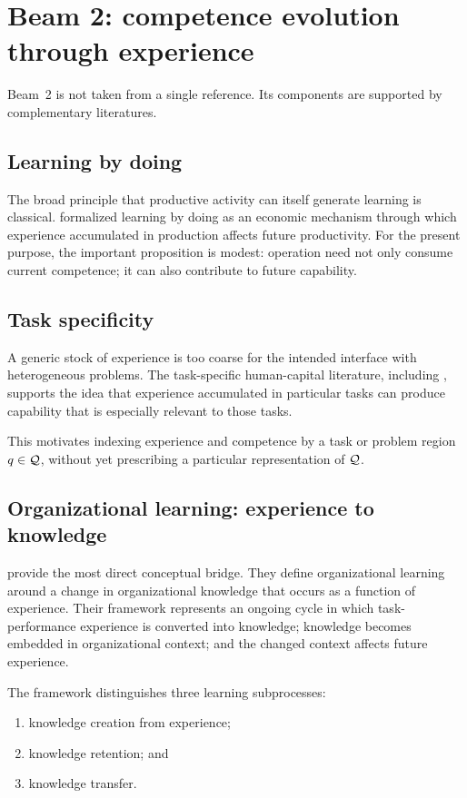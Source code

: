 \section{Beam 2: competence evolution through experience}

Beam~2 is not taken from a single reference. Its components are supported by complementary
literatures.

\subsection{Learning by doing}

The broad principle that productive activity can itself generate learning is classical.
\citet{arrow1962} formalized learning by doing as an economic mechanism through which
experience accumulated in production affects future productivity. For the present purpose,
the important proposition is modest: operation need not only consume current competence;
it can also contribute to future capability.

\subsection{Task specificity}

A generic stock of experience is too coarse for the intended interface with heterogeneous
problems. The task-specific human-capital literature, including \citet{gibbonswaldman2004},
supports the idea that experience accumulated in particular tasks can produce capability
that is especially relevant to those tasks.

This motivates indexing experience and competence by a task or problem region \(q\in\mathcal{Q}\),
without yet prescribing a particular representation of \(\mathcal{Q}\).

\subsection{Organizational learning: experience to knowledge}

\citet{argotemiron2011} provide the most direct conceptual bridge. They define organizational
learning around a change in organizational knowledge that occurs as a function of experience.
Their framework represents an ongoing cycle in which task-performance experience is converted
into knowledge; knowledge becomes embedded in organizational context; and the changed context
affects future experience.

The framework distinguishes three learning subprocesses:
\begin{enumerate}
\item knowledge creation from experience;
\item knowledge retention; and
\item knowledge transfer.
\end{enumerate}


